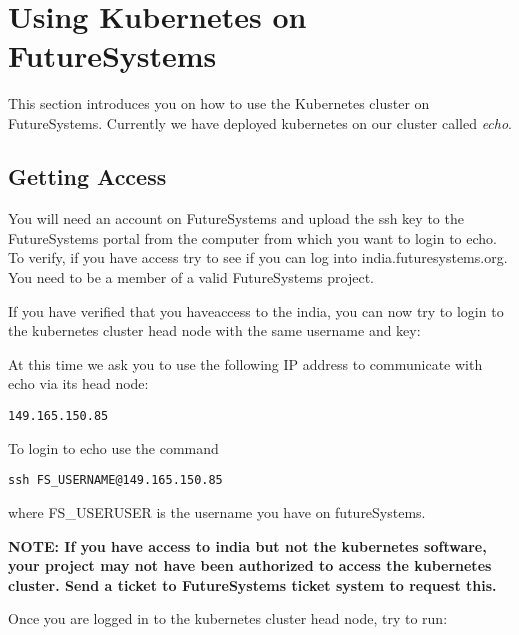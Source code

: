 \MDNAME\

\section{Using Kubernetes on FutureSystems}

\label{s:kubernetes-fs}

 

This section introduces you on how to use the Kubernetes cluster on
FutureSystems. Currently we have deployed kubernetes on our cluster
called \emph{echo}.

\subsection{Getting Access}

You will need an account on FutureSystems and upload the ssh key to the
FutureSystems portal from the computer from which you want to login to
echo. To verify, if you have access try to see if you can log into
india.futuresystems.org. You need to be a member of a valid
FutureSystems project.

If you have verified that you haveaccess to the india, you can now try
to login to the kubernetes cluster head node with the same username and
key:

At this time we ask you to use the following IP address to communicate
with echo via its head node:

\begin{lstlisting}
149.165.150.85
\end{lstlisting}

To login to echo use the command

\begin{lstlisting}
ssh FS_USERNAME@149.165.150.85
\end{lstlisting}

where FS\_USERUSER is the username you have on futureSystems.

\textbf{NOTE: If you have access to india but not the kubernetes
software, your project may not have been authorized to access the
kubernetes cluster. Send a ticket to FutureSystems ticket system to
request this.}

Once you are logged in to the kubernetes cluster head node, try to run:

